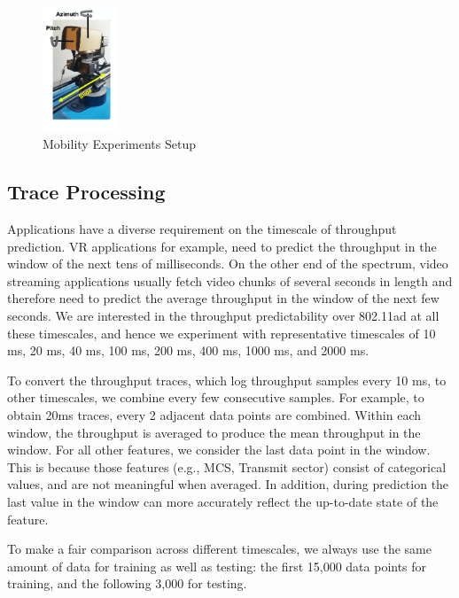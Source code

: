 \documentclass[sigconf,anonymous]{acmart}
\begin{document}

\begin{figure}[t]
    \centering
    \includegraphics[width=0.2\textwidth]{setup.png}
    \caption{Mobility Experiments Setup}
    \label{fig:setup}
\end{figure}

\subsection{Trace Processing}

Applications have a diverse requirement on the timescale of throughput prediction. VR applications for example, need to predict the throughput in the window of the next tens of milliseconds. On the other end of the spectrum, video streaming applications usually fetch video chunks of several seconds in length and therefore need to predict the average throughput in the window of the next few seconds. We are interested in the throughput predictability over 802.11ad at all these timescales, and hence we experiment with representative timescales of 10 ms, 20 ms, 40 ms, 100 ms, 200 ms, 400 ms, 1000 ms, and 2000 ms.

To convert the throughput traces, which log throughput samples every 10 ms, to other timescales, we combine every few consecutive samples. For example, to obtain 20ms traces, every 2 adjacent data points are combined. Within each window, the throughput is averaged to produce the mean throughput in the window. For all other features, we consider the last data point in the window. This is because those features (e.g., MCS, Transmit sector) consist of categorical values, and are not meaningful when averaged. In addition, during prediction the last value in the window can more accurately reflect the up-to-date state of the feature.

To make a fair comparison across different timescales, we always use the same amount of data for training as well as testing: the first 15,000 data points for training, and the following 3,000 for testing.
\end{document}

